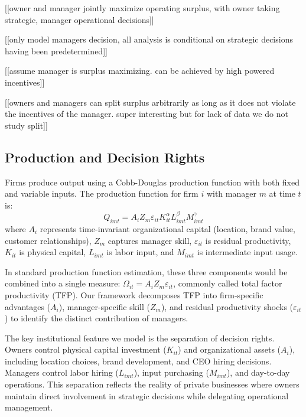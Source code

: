 \documentclass[11pt,a4paper]{article}
\begin{document}
[[owner and manager jointly maximize operating surplus, with owner taking strategic, manager operational decisions]]

[[only model managers decision, all analysis is conditional on strategic decisions having been predetermined]]

[[assume manager is surplus maximizing.  can be achieved by high powered incentives]]

[[owners and managers can split surplus arbitrarily as long as it does not violate the incentives of the manager. super interesting but for lack of data we do not study split]]


\subsection{Production and Decision Rights}

Firms produce output using a Cobb-Douglas production function with both fixed and variable inputs. The production function for firm $i$ with manager $m$ at time $t$ is:
\begin{equation}\label{eq:production}
Q_{imt} = A_i Z_{m} \varepsilon_{it} K_{it}^\alpha L_{imt}^{\beta} M_{imt}^{\gamma}
\end{equation}
where $A_i$ represents time-invariant organizational capital (location, brand value, customer relationships), $Z_m$ captures manager skill, $\varepsilon_{it}$ is residual productivity, $K_{it}$ is physical capital, $L_{imt}$ is labor input, and $M_{imt}$ is intermediate input usage. 

In standard production function estimation, these three components would be combined into a single measure: $\Omega_{it} = A_i Z_m \varepsilon_{it}$, commonly called total factor productivity (TFP). Our framework decomposes TFP into firm-specific advantages ($A_i$), manager-specific skill ($Z_m$), and residual productivity shocks ($\varepsilon_{it}$) to identify the distinct contribution of managers. 

The key institutional feature we model is the separation of decision rights. Owners control physical capital investment ($K_{it}$) and organizational assets ($A_i$), including location choices, brand development, and CEO hiring decisions. Managers control labor hiring ($L_{imt}$), input purchasing ($M_{imt}$), and day-to-day operations. This separation reflects the reality of private businesses where owners maintain direct involvement in strategic decisions while delegating operational management.
\end{document}
